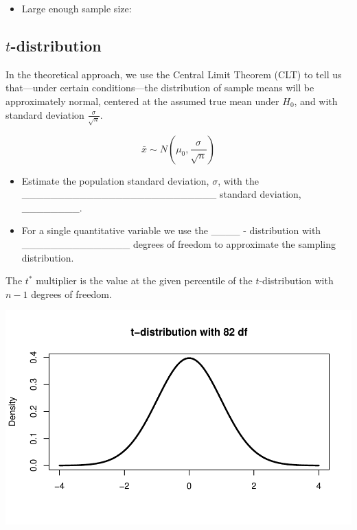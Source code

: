 \documentclass[
]{report}
\providecommand{\tightlist}{%
  \setlength{\itemsep}{0pt}\setlength{\parskip}{0pt}}
\begin{document}
\vspace{0.2in}

\begin{itemize}
\tightlist
\item
  Large enough sample size:
\end{itemize}

\vspace{0.2in}

\subsection*{\texorpdfstring{\(t\)-distribution}{t-distribution}}\label{t-distribution}

In the theoretical approach, we use the Central Limit Theorem (CLT) to tell us that---under certain conditions---the distribution of sample means will be approximately normal, centered at the assumed true mean under \(H_0\), and with standard deviation \(\frac{\sigma}{\sqrt{n}}\).

\[\bar{x} \sim N\left(\mu_0, \frac{\sigma}{\sqrt{n}}\right)\]

\begin{itemize}
\item
  Estimate the population standard deviation, \(\sigma\), with the
  \_\_\_\_\_\_\_\_\_\_\_\_\_\_\_\_\_\_\_\_\_\_\_\_\_\_\_ standard deviation, \_\_\_\_\_\_\_\_.
\item
  For a single quantitative variable we use the \_\_\_\_ - distribution
  with \_\_\_\_\_\_\_\_\_\_\_\_\_\_\_
  degrees of freedom to approximate the sampling distribution.
\end{itemize}


The \(t^*\) multiplier is the value at the given percentile of the \(t\)-distribution with \(n - 1\) degrees of freedom.

\begin{center}\includegraphics[width=0.7\linewidth]{06-VN06-EDAonemeanSim_files/figure-latex/tstarpb-1} \end{center}
\end{document}
